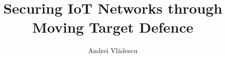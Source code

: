 \documentclass[a4paper,11pt]{scrreprt}                       %
\begin{document}

\title{Securing IoT Networks through Moving Target Defence}					    %
\author{Andrei Vlădescu}																				%

\maketitle


\tableofcontents 



\printnoidxglossaries																				%
\listoffigures 
{}


\clearpage











\cleardoublepage

\printbibliography
\end{document}
